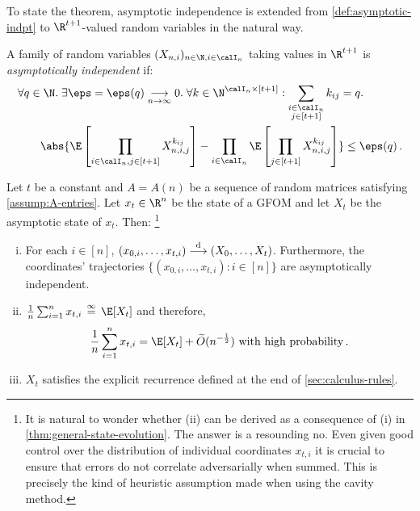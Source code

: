 \documentclass[12pt]{article}
\newcommand{\eqinf}{\,\overset{\infty}{=}\,}
\renewcommand{\tod}{\overset{\textnormal{d}}{\longrightarrow}}
\begin{document}
To state the theorem, asymptotic independence is extended from \cref{def:asymptotic-indpt} to $\R^{t+1}$-valued random variables
in the natural way. 
\begin{definition}
    A family of random variables $(X_{n,i})_{n\in\N,i\in \calI_n}$ taking values in $\R^{t+1}$ is \textit{asymptotically independent} if:
    \begin{align*} 
    &\forall q \in \N.\; \exists \eps=\eps(q) \underset{n\to\infty}{\longrightarrow} 0. \; \forall k  \in \N^{\calI_n\times [t+1]} : \sum_{\substack{i \in \calI_n\\ j \in [t+1]}} k_{ij} = q.\;\\
    &\qquad\abs{\E\left[ \prod_{\substack{i \in \calI_n, j \in [t+1]}} X_{n,i,j}^{k_{ij}}\right] - \prod_{i \in \calI_n}\E\left[\prod_{j \in [t+1]} X_{n,i,j}^{k_{ij}}\right]} \le \eps(q)\,.
    \end{align*}
\end{definition}

\begin{theorem}
    \label{thm:general-state-evolution}
    Let $t$ be a constant and $A = A(n)$ be a sequence of random matrices satisfying \cref{assump:A-entries}. Let $x_t\in \R^n$ be the state of a GFOM and let $X_t$ be the asymptotic state of $x_t$. Then: \footnote{It is natural to wonder whether (ii) can be derived as a consequence of (i) in \cref{thm:general-state-evolution}. The answer is a resounding no. Even given good control over the distribution of individual coordinates $x_{t,i}$ it is crucial to ensure that errors do not correlate adversarially when summed. This is precisely the kind of heuristic assumption made when using the cavity method.}
    \begin{enumerate}[(i)]
        \item For each $i \in [n]$, $(x_{0,i}, \dots, x_{t,i}) \tod (X_0, \dots, X_t)$.
        Furthermore, the coordinates' trajectories $\{(x_{0,i},\dots, x_{t,i}) : i \in [n]\}$ are asymptotically independent.
        \item $\frac{1}{n} \sum_{i = 1}^n x_{t,i} \eqinf \E[X_t]$ and therefore,
    \[
        \frac{1}{n} \sum_{i = 1}^n x_{t,i} = \E[X_t] + \widetilde{O}(n^{-\frac 1 2})\text{ with high probability}\,.
    \]
        \item $X_t$ satisfies the explicit recurrence defined at the end of \cref{sec:calculus-rules}.
    \end{enumerate}
\end{theorem}
\end{document}
